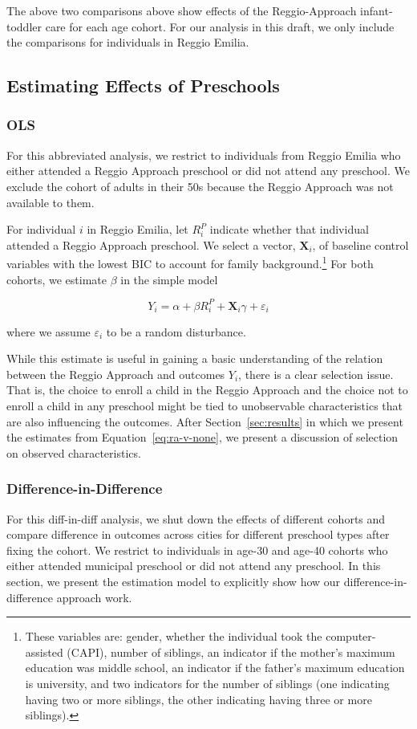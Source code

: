 The above two comparisons above show effects of the Reggio-Approach infant-toddler care for each age cohort. For our analysis in this draft, we only include the comparisons for individuals in Reggio Emilia. 

\subsection{Estimating Effects of Preschools}
\subsubsection{OLS}
For this abbreviated analysis, we restrict to individuals from Reggio Emilia who either attended a Reggio Approach preschool or did not attend any preschool. We exclude the cohort of adults in their 50s because the Reggio Approach was not available to them.

For individual $i$ in Reggio Emilia, let $R_i^{P}$ indicate whether that individual attended a Reggio Approach preschool. We select a vector, $\bm{X}_i$, of baseline control variables with the lowest BIC to account for family background.\footnote{These variables are: gender, whether the individual took the computer-assisted (CAPI), number of siblings, an indicator if the mother's maximum education was middle school, an indicator if the father's maximum education is university, and two indicators for the number of siblings (one indicating having two or more siblings, the other indicating having three or more siblings).} For both cohorts, we estimate $\beta$ in the simple model

\begin{equation}
	Y_i = \alpha + \beta R_i^{P} + \bm{X}_i\gamma + \varepsilon_i
	\label{eq:ra-v-none}
\end{equation}

\noindent where we assume $\varepsilon_i$ to be a random disturbance. 

While this estimate is useful in gaining a basic understanding of the relation between the Reggio Approach and outcomes $Y_i$, there is a clear selection issue. That is, the choice to enroll a child in the Reggio Approach and the choice not to enroll a child in any preschool might be tied to unobservable characteristics that are also influencing the outcomes. After Section~\ref{sec:results} in which we present the estimates from Equation~\eqref{eq:ra-v-none}, we present a discussion of selection on observed characteristics.

\subsubsection{Difference-in-Difference}
For this diff-in-diff analysis, we shut down the effects of different cohorts and compare difference in outcomes across cities for different preschool types after fixing the cohort. We restrict to individuals in age-30 and age-40 cohorts who either attended municipal preschool or did not attend any preschool. In this section, we present the estimation model to explicitly show how our difference-in-difference approach work. 

